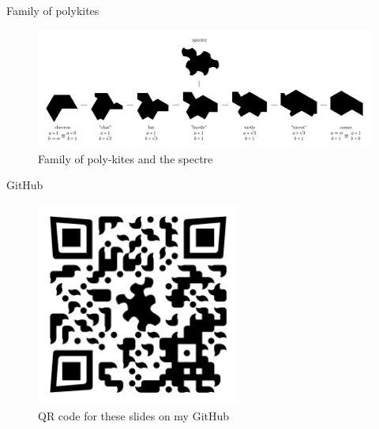 \documentclass{beamer}
\begin{document}
\begin{frame}{Family of polykites}
    \begin{figure}
        \centering
        \includegraphics[width=\textwidth]{images/polykite-family/monotile-continuum.png}
        \caption{Family of poly-kites and the spectre}
        \label{fig:poly-kites-spectre}
    \end{figure}
\end{frame}

%     

\begin{frame}{GitHub}
    \begin{figure}
        \centering
        \includegraphics[width=0.6\textwidth]{images/qr-codes/tilling-presentation-github.png}
        \caption{QR code for these slides on my GitHub}
        \label{fig:github-qrcode}
    \end{figure}
\end{frame}
\end{document}
